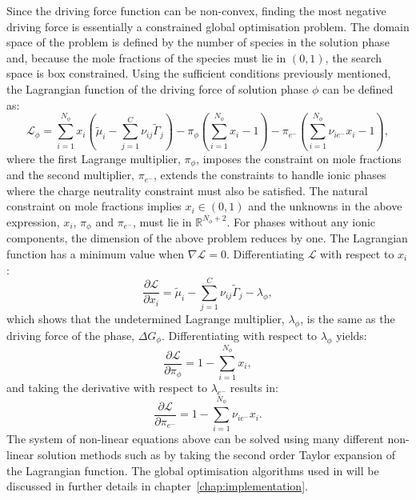 Since the driving force function can be non-convex, finding the most negative driving force is essentially a constrained global optimisation problem. The domain space of  the problem is defined by the number of species in the solution phase and, because the mole fractions of the species must lie in $(0,1)$, the search space is box constrained. Using the sufficient conditions previously mentioned, the Lagrangian function of the driving force of solution phase $\phi$ can be defined as:
	\begin{equation}\label{eq:DrivingForceLagrangian}
		\mathcal{L}_\phi = \sum_{i=1}^{N_\phi} x_i \left(\tilde{\mu}_i - \sum_{j=1}^{C} \nu_{ij} \tilde{\Gamma}_j \right)
						 - \pi_\phi \left( \sum_{i=1}^{N_\phi} x_i - 1 \right)
						 - \pi_{e^-} \left( \sum_{i=1}^{N_\phi} \nu_{i {e^-}} x_i - 1 \right),
	\end{equation}
	where the first Lagrange multiplier, $\pi_{\phi}$, imposes the constraint on mole fractions and the second multiplier, $\pi_{e^-}$, extends the constraints to handle ionic phases where the charge neutrality constraint must also be satisfied. The natural constraint on mole fractions implies $x_i \in (0, 1)$ and the  unknowns in the above expression, $x_i$, $\pi_{\phi}$ and $\pi_{e^-}$, must lie in $\mathbb{R}^{N_\phi + 2}$. For phases without any ionic components, the dimension of the above problem reduces by one.  The Lagrangian function has a minimum value when $\nabla \mathcal{L} = 0$. Differentiating $\mathcal{L}$ with respect to $x_i$:
	\begin{equation}
		\frac{\partial \mathcal{L}}{\partial x_i}	= \tilde{\mu}_i -  \sum_{j=1}^{C} \nu_{ij} \tilde{\Gamma}_j - \lambda_\phi,
	\end{equation}
	which shows that the undetermined Lagrange multiplier, $\lambda_\phi$, is the same as the driving force of the phase, $\Delta G_\phi$. Differentiating with respect to $\lambda_\phi$ yields:
	\begin{equation}
		\frac{\partial \mathcal{L}}{\partial \pi_\phi}	= 1 - \sum_{i=1}^{N_\phi} x_i,
	\end{equation}
	and taking the derivative with respect to $\lambda_{e^-}$ results in:
	\begin{equation}
		\frac{\partial \mathcal{L}}{\partial \pi_{e^-}}	= 1 - \sum_{i=1}^{N_\phi} \nu_{i {e^-}} x_i.
	\end{equation}
	The system of non-linear equations above can be solved using many different non-linear solution methods such as by taking the second order Taylor expansion of the Lagrangian function. The global optimisation algorithms used in {\GEM} will be discussed in further details in chapter~\ref{chap:implementation}.

